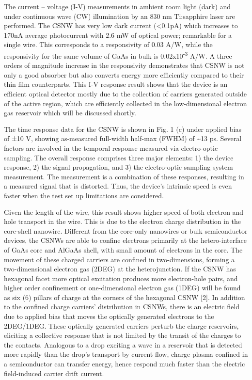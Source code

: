 The current -- voltage (I-V) measurements in ambient room light (dark)
and under continuous wave (CW) illumination by an 830 nm Ti:sapphire
laser are performed. The CSNW has very low dark current
(\textless{}0.1pA) which increases to 170nA average photocurrent with
2.6 mW of optical power; remarkable for a single wire. This corresponds
to a responsivity of 0.03 A/W, while the responsivity for the same
volume of GaAs in bulk is 0.02x10\textsuperscript{-3} A/W. A three
orders of magnitude increase in the responsivity demonstrates that CSNW
is not only a good absorber but also converts energy more efficiently
compared to their thin film counterparts. This I-V response result shows
that the device is an efficient optical detector mostly due to the
collection of carriers generated outside of the active region, which are
efficiently collected in the low-dimensional electron gas reservoir
which will be discussed shortly.

The time response data for the CSNW is shown in Fig. 1 (c) under applied
bias of ±10 V, showing as-measured full-width half-max (FWHM) of
\textasciitilde{}13 ps. Several factors are involved in the temporal
response measured via electro-optic sampling. The overall response
comprises three major elements: 1) the device response, 2) the signal
propagation, and 3) the electro-optic sampling system measurement. The
measurement is a combination of these responses, resulting in a measured
signal that is distorted. Thus, the device's intrinsic speed is even
faster when the test set up limitations are considered.

Given the length of the wire, this result shows higher speed of both
electron and hole transport in the wire. This is due to the electron
charge distribution in the core-shell nanowire. Different from the
core-only nanowires or bulk semiconductor devices, the CSNWs are able to
confine electrons primarily at the hetero-interface of GaAs core and
AlGaAs shell, with small amount of electrons in the core. The movement
of these charged carriers are confined in two-dimensions, forming a
two-dimensional electron gas (2DEG) at the heterojunction. If the CSNW
has hexagonal facet more optical excitation produces more electron-hole
pairs, and higher order confinement or one-dimensional electron gas
(1DEG) will be found as six (6) pillars of charge at the corners of the
hexagonal CSNW {[}2{]}. In addition to the confined charge carriers'
distribution in CSNWs, there is an electric field due to applied bias
that moves the optically generated electrons to the 2DEG/1DEG. These
optically generated carriers perturb the charge reservoirs, eliciting a
collective response that is not limited by the transit of the charges to
the contacts. Analogous to a drop exciting a wave in a reservoir that is
detected more rapidly than the drop's transport by current flow, charge
plasma confined in a semiconductor can transfer energy, hence respond
much faster than the electric field-induced carrier drift current.

